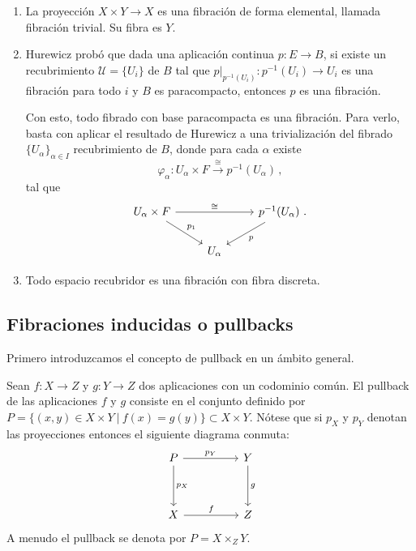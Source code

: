 \begin{ejems}
\begin{enumerate}
\item La proyección $X \times Y \longrightarrow X$ es una fibración de forma elemental, llamada fibración trivial. Su fibra es $Y$.
\item Hurewicz probó que dada una aplicación continua $p: E \longrightarrow B$, si existe un recubrimiento $\mathcal{U} = \{U_i\}$ de $B$ tal que $p \vert_{p^{-1}(U_i)} : p^{-1}(U_i) \longrightarrow U_i$ es una fibración para todo $i$ y $B$ es paracompacto, entonces $p$ es una fibración. \par
Con esto, todo fibrado con base paracompacta es una fibración. Para verlo, basta con aplicar el resultado de Hurewicz a una trivialización del fibrado $\{ U_\alpha \}_{\alpha \in I}$ recubrimiento de $B$, donde para cada $\alpha$ existe 
\[
\varphi_\alpha : U_\alpha \times F \stackrel{\cong}{\longrightarrow} p^{-1}(U_\alpha) \, ,
\]
tal que
\[
\begin{tikzcd}
U_\alpha \times F \arrow{rr}{\cong} \arrow{dr}{p_1} & & p^{-1}(U_\alpha) \ . \arrow{ld}{p} \\
& U_\alpha &
\end{tikzcd}
\]

\item Todo espacio recubridor es una fibración con fibra discreta.
\end{enumerate}
\end{ejems}

\newpage 
\subsection{Fibraciones inducidas o pullbacks}
Primero introduzcamos el concepto de pullback en un ámbito general. 
\begin{defin}
Sean $f : X \longrightarrow Z$ y $g: Y \longrightarrow Z$ dos aplicaciones con un codominio común. El pullback de las aplicaciones $f$ y $g$ consiste en el conjunto definido por $P = \{ (x, y) \in X \times Y \ \vert \ f(x) = g(y) \} \subset X \times Y$. Nótese que si $p_X$ y $p_Y$ denotan las proyecciones entonces el siguiente diagrama conmuta:
\[
\begin{tikzcd}
P \arrow{rr}{p_Y} \arrow{dd}{p_X} && Y \arrow{dd}{g} \\
\\
X \arrow{rr}{f} && Z
\end{tikzcd}
\]
A menudo el pullback se denota por $P = X \times_Z Y$.
\end{defin}


